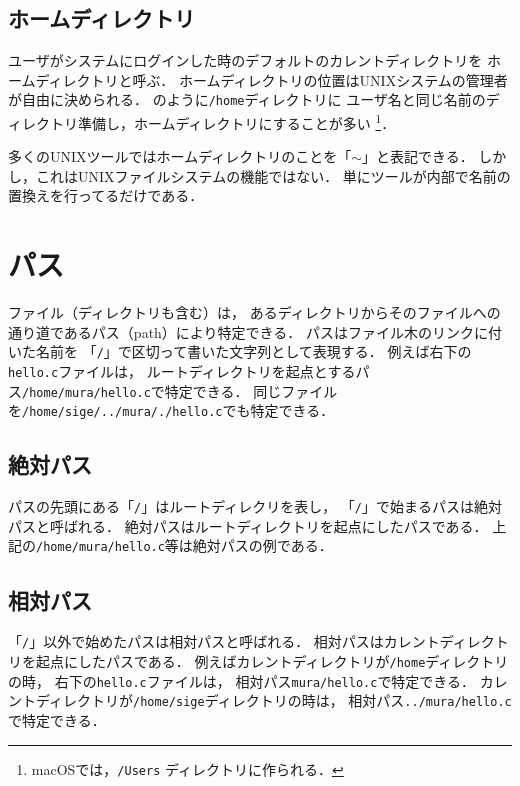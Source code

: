 \subsection*{ホームディレクトリ}
ユーザがシステムにログインした時のデフォルトのカレントディレクトリを
ホームディレクトリと呼ぶ．
ホームディレクトリの位置はUNIXシステムの管理者が自由に決められる．
のように\texttt{/home}ディレクトリに
ユーザ名と同じ名前のディレクトリ準備し，ホームディレクトリにすることが多い
\footnote{macOSでは，\texttt{/Users} ディレクトリに作られる．}．

多くのUNIXツールではホームディレクトリのことを「\texttt{$\sim$}」と表記できる．
しかし，これはUNIXファイルシステムの機能ではない．
単にツールが内部で名前の置換えを行ってるだけである．

\section{パス}
ファイル（ディレクトリも含む）は，
あるディレクトリからそのファイルへの通り道であるパス（path）により特定できる．
パスはファイル木のリンクに付いた名前を
「\texttt{/}」で区切って書いた文字列として表現する．
例えば右下の\texttt{hello.c}ファイルは，
ルートディレクトリを起点とするパス\texttt{/home/mura/hello.c}で特定できる．
同じファイルを\texttt{/home/sige/../mura/./hello.c}でも特定できる．

\subsection*{絶対パス}
パスの先頭にある「\texttt{/}」はルートディレクリを表し，
「\texttt{/}」で始まるパスは絶対パスと呼ばれる．
絶対パスはルートディレクトリを起点にしたパスである．
上記の\texttt{/home/mura/hello.c}等は絶対パスの例である．

\subsection*{相対パス}
「\texttt{/}」以外で始めたパスは相対パスと呼ばれる．
相対パスはカレントディレクトリを起点にしたパスである．
例えばカレントディレクトリが\texttt{/home}ディレクトリの時，
右下の\texttt{hello.c}ファイルは，
相対パス\texttt{mura/hello.c}で特定できる．
カレントディレクトリが\texttt{/home/sige}ディレクトリの時は，
相対パス\texttt{../mura/hello.c}で特定できる．

